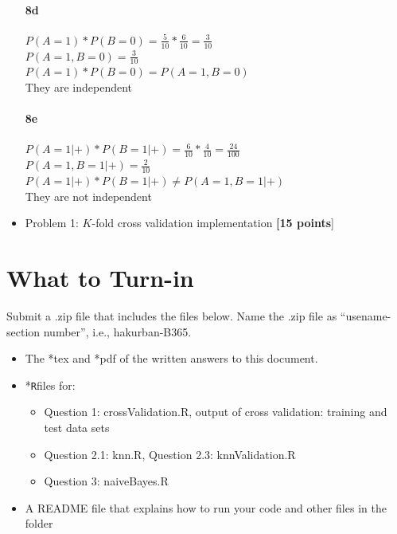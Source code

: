 \documentclass{article}
\newcommand{\quotes}[1]{``#1''}
\begin{document}
\begin{itemize}
\paragraph{8d}
$P(A = 1) * P(B = 0) = \frac{5}{10}* \frac{6}{10} = \frac{3}{10}$\\
$P(A = 1, B = 0) = \frac{3}{10}$\\
$P(A = 1) * P(B = 0) = P(A = 1, B = 0)$\\
They are independent
\paragraph{8e}
$P(A = 1| +) * P(B = 1|+) = \frac{6}{10}* \frac{4}{10} = \frac{24}{100}$\\
$P(A = 1, B = 1| +) = \frac{2}{10}$\\
$P(A = 1|+) * P(B = 1|+) \neq P(A = 1, B = 1|+)$\\
They are not independent
\item Problem 1: $K$-fold cross validation implementation  \textbf{[15 points}]
\end{itemize}




\section*{What to Turn-in}
 Submit a .zip file that includes the files below. Name the .zip  file as \quotes{usename-section number}, i.e., hakurban-B365.


\begin{itemize}
\item The *tex and *pdf of the written answers to this document.
\item *\texttt{R}files for:
\begin{itemize}
\item Question 1: \textsf{crossValidation.R}, output of cross validation: training  and test data sets 
\item Question 2.1: \textsf{knn.R}, Question 2.3: \textsf{knnValidation.R}
\item Question 3: \textsf{naiveBayes.R}
\end{itemize} 
\item A README file that explains how to run your code and other files in the folder
\end{itemize}
\end{document}

